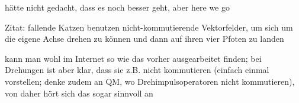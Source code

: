 \documentclass[../H_Analysis_main.tex]{subfiles}
\begin{document}
\begin{bsp}[Katzen]
hätte nicht gedacht, dass es noch besser geht, aber here we go

Zitat: fallende Katzen benutzen nicht-kommutierende Vektorfelder, um sich um die eigene Achse drehen zu können und dann auf ihren vier Pfoten zu landen

kann man wohl im Internet so wie das vorher ausgearbeitet finden; bei Drehungen ist aber klar, dass sie z.B. nicht kommutieren (einfach einmal vorstellen; denke zudem an QM, wo Drehimpulsoperatoren nicht kommutieren), von daher hört sich das sogar sinnvoll an
\end{bsp}



\newpage
\end{document}
